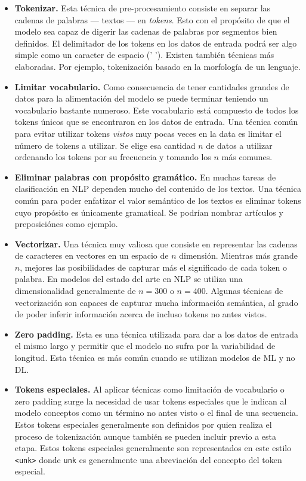\begin{itemize}
\item \textbf{Tokenizar.} Esta técnica de pre-procesamiento consiste en separar las cadenas de palabras --- textos --- en \emph{tokens}. Esto con el propósito de que el modelo sea capaz de digerir las cadenas de palabras por segmentos bien definidos. El delimitador de los tokens en los datos de entrada podrá ser algo simple como un caracter de espacio (' '). Existen también técnicas más elaboradas. Por ejemplo, tokenización basado en la morfología de un lenguaje.
\item \textbf{Limitar vocabulario.} Como consecuencia de tener cantidades grandes de datos para la alimentación del modelo se puede terminar teniendo un vocabulario bastante numeroso. Este vocabulario está compuesto de todos los tokens únicos que se encontraron en los datos de entrada. Una técnica común para evitar utilizar tokens \emph{vistos} muy pocas veces en la data es limitar el número de tokens a utilizar. Se elige esa cantidad $n$ de datos a utilizar ordenando los tokens por su frecuencia y tomando los $n$ más comunes.
\item \textbf{Eliminar palabras con propósito gramático.} En muchas tareas de clasificación en NLP dependen mucho del contenido de los textos. Una técnica común para poder enfatizar el valor semántico de los textos es eliminar tokens cuyo propósito es únicamente gramatical. Se podrían nombrar artículos y preposiciónes como ejemplo.
\item \textbf{Vectorizar.} Una técnica muy valiosa que consiste en representar las cadenas de caracteres en vectores en un espacio de $n$ dimensión. Mientras más grande $n$, mejores las posibilidades de capturar más el significado de cada token o palabra. En modelos del estado del arte en NLP se utiliza una dimensionalidad generalmente de $n = 300$ o $n = 400$. Algunas técnicas de vectorización son capaces de capturar mucha información semántica, al grado de poder inferir información acerca de incluso tokens no antes vistos.
\item \textbf{Zero padding.} Esta es una técnica utilizada para dar a los datos de entrada el mismo largo y permitir que el modelo no sufra por la variabilidad de longitud. Esta técnica es más común cuando se utilizan modelos de ML y no DL.
\item \textbf{Tokens especiales.} Al aplicar técnicas como limitación de vocabulario o zero padding surge la necesidad de usar tokens especiales que le indican al modelo conceptos como un término no antes visto o el final de una secuencia. Estos tokens especiales generalmente son definidos por quien realiza el proceso de tokenización aunque también se pueden incluir previo a esta etapa. Estos tokens especiales generalmente son representados en este estilo \texttt{<unk>} donde \texttt{unk} es generalmente una abreviación del concepto del token especial. 
\end{itemize}

